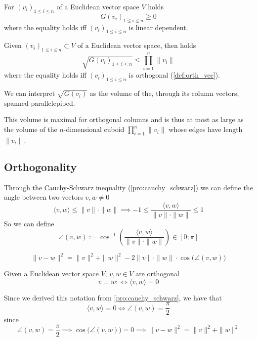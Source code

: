 \begin{proposition}
   For \((v_i)_{1 \leq i \leq n}\) of a Euclidean vector space \(V\) holds
   \[G(v_i)_{1 \leq i \leq n} \geq 0\]
   where the equality holds iff \((v_i)_{1 \leq i \leq n}\) is linear dependent.
\end{proposition}

\begin{proposition}
   Given \((v_i)_{1 \leq i \leq n} \subset V\) of a Euclidean vector space, then holds
   \[\sqrt{G(v_i)_{1 \leq i \leq n}} \leq \prod_{i=1}^n \|v_i\|\]
   where the equality holds iff \((v_i)_{1 \leq i \leq n}\) is orthogonal (\ref{def:orth_vec}).
\end{proposition}
\begin{remark}
   We can interpret \(\sqrt{G(v_i)}\) as the volume of the, through its column vectors, spanned parallelepiped.

   \begin{center}
      
   \end{center}

   This volume is maximal for orthogonal columns and is thus at most as large as the volume of the \(n\)-dimensional cuboid \(\prod_{i=1}^n \|v_i\|\) whose edges have length \(\|v_i\|\).
\end{remark}


\subsection{Orthogonality}
Through the Cauchy-Schwarz inequality (\ref{pro:cauchy_schwarz}) we can define the angle between two vectors \(v, w \neq 0\)
\[\langle v, w\rangle \leq \|v\|\cdot\|w\| \implies -1 \leq \frac{\langle v, w\rangle}{\|v\| \cdot \|w\|} \leq 1\]
So we can define
\[\angle(v, w) := \cos^{-1}\left(\frac{\langle v, w\rangle}{\|v\| \cdot \|w\|}\right) \in [0; \pi]\]

\begin{proposition}
   \[\|v - w\|^2 = \|v\|^2 + \|w\|^2 - 2\|v\| \cdot \|w\| \cdot \cos\big(\angle(v, w)\big)\]
\end{proposition}

\begin{definition}\label{def:orth_vec}
   Given a Euclidean vector space \(V\), \(v, w \in V\) are orthogonal
   \[v \perp w :\iff \langle v, w\rangle = 0\]
\end{definition}
\begin{remark}
   Since we derived this notation from \cref{pro:cauchy_schwarz}, we have that
   \[\langle v, w \rangle = 0 \iff \angle(v, w) = \frac{\pi}{2}\]
   since
   \[\angle(v, w) = \frac{\pi}{2} \implies \cos\big(\angle(v, w)\big) = 0 \implies \|v - w\|^2 = \|v\|^2 + \|w\|^2\]
\end{remark}


